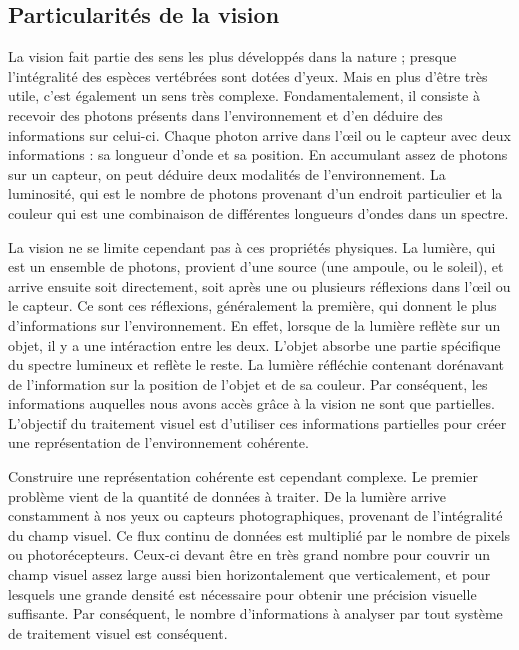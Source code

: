 \subsection{Particularités de la vision}\label{sec:sota:vision}

	La vision fait partie des sens les plus développés dans la nature ; presque l'intégralité des espèces vertébrées sont dotées d'yeux. Mais en plus d'être très utile, c'est également un sens très complexe. Fondamentalement, il consiste à recevoir des photons présents dans l'environnement et d'en déduire des informations sur celui-ci. Chaque photon arrive dans l'œil ou le capteur avec deux informations : sa longueur d'onde et sa position. En accumulant assez de photons sur un capteur, on peut déduire deux modalités de l'environnement. La luminosité, qui est le nombre de photons provenant d'un endroit particulier et la couleur qui est une combinaison de différentes longueurs d'ondes dans un spectre.

	La vision ne se limite cependant pas à ces propriétés physiques. La lumière, qui est un ensemble de photons, provient d'une source (une ampoule, ou le soleil), et arrive ensuite soit directement, soit après une ou plusieurs réflexions dans l'œil ou le capteur. Ce sont ces réflexions, généralement la première, qui donnent le plus d'informations sur l'environnement. En effet, lorsque de la lumière reflète sur un objet, il y a une intéraction entre les deux. L'objet absorbe une partie spécifique du spectre lumineux et reflète le reste. La lumière réfléchie contenant dorénavant de l'information sur la position de l'objet et de sa couleur. Par conséquent, les informations auquelles nous avons accès grâce à la vision ne sont que partielles. L'objectif du traitement visuel est d'utiliser ces informations partielles pour créer une représentation de l'environnement cohérente.

	Construire une représentation cohérente est cependant complexe. Le premier problème vient de la quantité de données à traiter. De la lumière arrive constamment à nos yeux ou capteurs photographiques, provenant de l'intégralité du champ visuel. Ce flux continu de données est multiplié par le nombre de pixels ou photorécepteurs. Ceux-ci devant être en très grand nombre pour couvrir un champ visuel assez large aussi bien horizontalement que verticalement, et pour lesquels une grande densité est nécessaire pour obtenir une précision visuelle suffisante. Par conséquent, le nombre d'informations à analyser par tout système de traitement visuel est conséquent.

